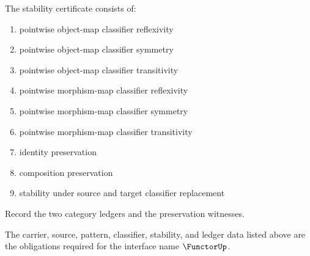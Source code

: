\begin{definition}
\label{def:functor-stability-certificate}
The stability certificate consists of:
\begin{enumerate}
  \item pointwise object-map classifier reflexivity
  \item pointwise object-map classifier symmetry
  \item pointwise object-map classifier transitivity
  \item pointwise morphism-map classifier reflexivity
  \item pointwise morphism-map classifier symmetry
  \item pointwise morphism-map classifier transitivity
  \item identity preservation
  \item composition preservation
  \item stability under source and target classifier replacement
\end{enumerate}
\end{definition}

\begin{definition}
\label{def:functor-ledger-policy}
Record the two category ledgers and the preservation witnesses.
\end{definition}

\begin{definition}
\label{def:functor-certificate-obligations}
The carrier, source, pattern, classifier, stability, and ledger data listed above are the obligations required for the interface name \(\FunctorUp\).
\end{definition}

